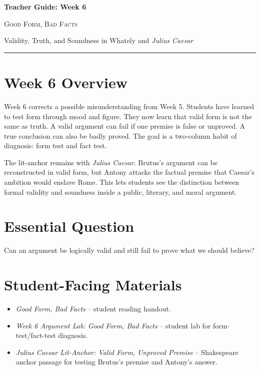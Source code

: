 \documentclass[12pt]{article}
\begin{document}
\begin{center}
{\LARGE\bfseries Teacher Guide: Week 6}\par\vspace{0.25em}
{\large\scshape Good Form, Bad Facts}\par\vspace{0.4em}
{Validity, Truth, and Soundness in Whately and \textit{Julius Caesar}}\par\vspace{0.6em}
\rule{0.82\textwidth}{0.4pt}
\end{center}

\section*{Week 6 Overview}
Week 6 corrects a possible misunderstanding from Week 5. Students have learned to test form through mood and figure. They now learn that valid form is not the same as truth. A valid argument can fail if one premise is false or unproved. A true conclusion can also be badly proved. The goal is a two-column habit of diagnosis: form test and fact test.

The lit-anchor remains with \textit{Julius Caesar}. Brutus's argument can be reconstructed in valid form, but Antony attacks the factual premise that Caesar's ambition would enslave Rome. This lets students see the distinction between formal validity and soundness inside a public, literary, and moral argument.

\section*{Essential Question}
Can an argument be logically valid and still fail to prove what we should believe?

\section*{Student-Facing Materials}
\begin{itemize}[leftmargin=*]
\item \textit{Good Form, Bad Facts} -- student reading handout.
\item \textit{Week 6 Argument Lab: Good Form, Bad Facts} -- student lab for form-test/fact-test diagnosis.
\item \textit{Julius Caesar Lit-Anchor: Valid Form, Unproved Premise} -- Shakespeare anchor passage for testing Brutus's premise and Antony's answer.
\end{itemize}
\end{document}
